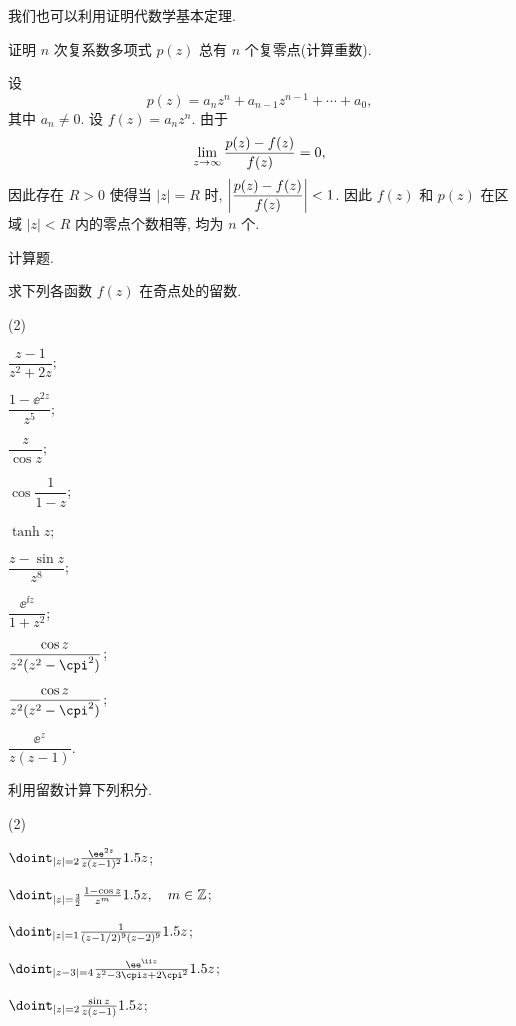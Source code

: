 我们也可以利用\thmRouche 证明代数学基本定理.
\begin{example}[代数学基本定理]
	证明 $n$ 次复系数多项式 $p(z)$ 总有 $n$ 个复零点(计算重数).
\end{example}

\begin{solution}
  设
  \[
    p(z)=a_nz^n+a_{n-1}z^{n-1}+\cdots+a_0,
  \]
  其中 $a_n\neq 0$.
  设 $f(z)=a_n z^n$.
  由于
  \[
    \lim_{z\rightarrow\infty}\frac{p(z)-f(z)}{f(z)}=0,
  \]
  因此存在 $R>0$ 使得当 $|z|=R$ 时, $\left|\dfrac{p(z)-f(z)}{f(z)}\right|<1$.
  因此 $f(z)$ 和 $p(z)$ 在区域 $|z|<R$ 内的零点个数相等, 均为 $n$ 个.
\end{solution}



\begin{homework}
  \item 计算题.
  \begin{subex}
    \item 求下列各函数 $f(z)$ 在奇点处的留数.
      \begin{subsubex}(2)
        \item $\dfrac{z-1}{z^2+2z}$;
        \item $\dfrac{1-\ee^{2z}}{z^5}$;
        \item $\dfrac z{\cos z}$;
        \item $\cos\dfrac1{1-z}$;
        \item $\tanh z$;
        \item $\dfrac{z-\sin z}{z^8}$;
        \item $\dfrac{\ee^{\ii z}}{1+z^2}$;
        \item $\dfrac{\cos z}{z^2(z^2-\cpi^2)}$;
        \item $\dfrac{\cos z}{z^2(z^2-\cpi^2)}$;
        \item $\dfrac{\ee^z}{z(z-1)}$.
      \end{subsubex}
    \item 利用留数计算下列积分.
      \begin{subsubex}(2)
        \item $\doint_{|z|=2}\frac{\ee^{2z}}{z(z-1)^2}\d z$;
        \item $\doint_{|z|=\frac32}\frac{1-\cos z}{z^m}\d z,\quad m\in\BZ$;
        \item $\doint_{|z|=1}\frac1{(z-1/2)^9(z-2)^9}\d z$;
        \item $\doint_{|z-3|=4}\frac{\ee^{\ii z}}{z^2-3\cpi z+2\cpi^2}\d z$;
        \item $\doint_{|z|=2}\frac{\sin z}{z(z-1)}\d z$;

\end{subsubex}
\end{subex}
\end{homework}
